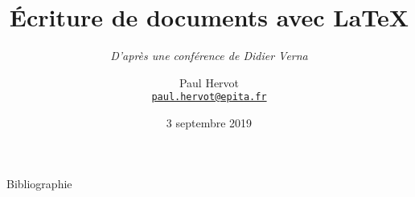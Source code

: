 \documentclass{beamer} %
\title{Écriture de documents avec \LaTeX{}}
\subtitle{\texorpdfstring{\small{\emph{D'après une conférence de Didier Verna}\cite{latexDV}}}
                         {D'après une conférence de Didier Verna}}
\institute{EPITA}
\author{
    \texorpdfstring
    { %
        Paul Hervot\\
        \href{mailto:paul.hervot@epita.fr}{\nolinkurl{paul.hervot@epita.fr}}
    }{ %
        Paul Hervot
    }
}
\date{3 septembre 2019}
\begin{document}
\frame{\titlepage{}}

\begin{frame}[allowframebreaks]{Bibliographie}
    \printbibliography{}
\end{frame}
\end{document}
